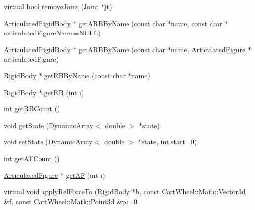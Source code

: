 \begin{DoxyCompactItemize}
\item 
virtual bool \hyperlink{classCartWheel_1_1Physics_1_1World_a5f13914f86bf8007f88b238111233ff6}{removeJoint} (\hyperlink{classCartWheel_1_1Physics_1_1Joint}{Joint} $\ast$jt)
\item 
\hyperlink{classCartWheel_1_1Physics_1_1ArticulatedRigidBody}{ArticulatedRigidBody} $\ast$ \hyperlink{classCartWheel_1_1Physics_1_1World_a88d5eff7b76c58aaed462d1752de694f}{getARBByName} (const char $\ast$name, const char $\ast$articulatedFigureName=NULL)
\item 
\hyperlink{classCartWheel_1_1Physics_1_1ArticulatedRigidBody}{ArticulatedRigidBody} $\ast$ \hyperlink{classCartWheel_1_1Physics_1_1World_a9756f61b281bcec50e35defdb84b067b}{getARBByName} (const char $\ast$name, \hyperlink{classCartWheel_1_1Physics_1_1ArticulatedFigure}{ArticulatedFigure} $\ast$articulatedFigure)
\item 
\hyperlink{classCartWheel_1_1Physics_1_1RigidBody}{RigidBody} $\ast$ \hyperlink{classCartWheel_1_1Physics_1_1World_a47eefe8fbb4f3bf33012d6831dceac65}{getRBByName} (const char $\ast$name)
\item 
\hyperlink{classCartWheel_1_1Physics_1_1RigidBody}{RigidBody} $\ast$ \hyperlink{classCartWheel_1_1Physics_1_1World_aff67bf9e59ad1d4d894ef9e96a587e3b}{getRB} (int i)
\item 
int \hyperlink{classCartWheel_1_1Physics_1_1World_a8f439f879322e8305cd1e32f69ff1b4a}{getRBCount} ()
\item 
void \hyperlink{classCartWheel_1_1Physics_1_1World_adc85d2be4988427c2c8da501c81ca7b0}{getState} (DynamicArray$<$ double $>$ $\ast$state)
\item 
void \hyperlink{classCartWheel_1_1Physics_1_1World_a8dd0eefe9170b86b0bca968851db88f5}{setState} (DynamicArray$<$ double $>$ $\ast$state, int start=0)
\item 
int \hyperlink{classCartWheel_1_1Physics_1_1World_a715ae803217d1c465ec331c6eff89397}{getAFCount} ()
\item 
\hyperlink{classCartWheel_1_1Physics_1_1ArticulatedFigure}{ArticulatedFigure} $\ast$ \hyperlink{classCartWheel_1_1Physics_1_1World_ad0f9799acc13594e77dbf37654244868}{getAF} (int i)
\item 
virtual void \hyperlink{classCartWheel_1_1Physics_1_1World_a87da6dd55397da4ceceaa457be2e1a89}{applyRelForceTo} (\hyperlink{classCartWheel_1_1Physics_1_1RigidBody}{RigidBody} $\ast$b, const \hyperlink{classCartWheel_1_1Math_1_1Vector3d}{CartWheel::Math::Vector3d} \&f, const \hyperlink{classCartWheel_1_1Math_1_1Point3d}{CartWheel::Math::Point3d} \&p)=0

\end{DoxyCompactItemize}
